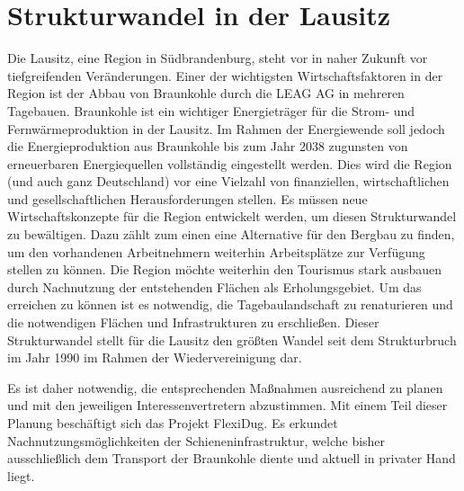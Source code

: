 \section{Strukturwandel in der Lausitz}
Die Lausitz, eine Region in Südbrandenburg, steht vor in naher Zukunft vor tiefgreifenden Veränderungen. Einer der wichtigsten Wirtschaftsfaktoren in der Region ist der Abbau von Braunkohle durch die LEAG AG in mehreren Tagebauen. Braunkohle ist ein wichtiger Energieträger für die Strom- und Fernwärmeproduktion in der Lausitz. Im Rahmen der Energiewende soll jedoch die Energieproduktion aus Braunkohle bis zum Jahr 2038 zugunsten von erneuerbaren Energiequellen vollständig eingestellt werden. Dies wird die Region  (und auch ganz Deutschland) vor eine Vielzahl von finanziellen, wirtschaftlichen und gesellschaftlichen Herausforderungen stellen. Es müssen neue Wirtschaftskonzepte für die Region entwickelt werden, um diesen Strukturwandel zu bewältigen. Dazu zählt zum einen eine Alternative für den Bergbau zu finden, um den vorhandenen Arbeitnehmern weiterhin Arbeitsplätze zur Verfügung stellen zu können. Die Region möchte weiterhin den Tourismus stark ausbauen durch Nachnutzung der entstehenden Flächen als Erholungsgebiet. Um das erreichen zu können ist es notwendig, die Tagebaulandschaft zu renaturieren und die notwendigen Flächen und Infrastrukturen zu erschließen. Dieser Strukturwandel stellt für die Lausitz den größten Wandel seit dem Strukturbruch im Jahr 1990 im Rahmen der Wiedervereinigung dar.

Es ist daher notwendig, die entsprechenden Maßnahmen ausreichend zu planen und mit den jeweiligen Interessenvertretern abzustimmen. Mit einem Teil dieser Planung beschäftigt sich das Projekt FlexiDug. Es erkundet Nachnutzungsmöglichkeiten der Schieneninfrastruktur, welche bisher ausschließlich dem Transport der Braunkohle diente und aktuell in privater Hand liegt.